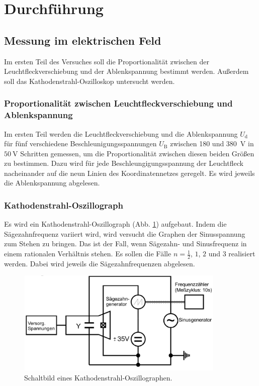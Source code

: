 \section{Durchführung}
\label{sec:Durchführung}

\subsection{Messung im elektrischen Feld}
Im ersten Teil des Versuches soll die Proportionalität zwischen
der Leuchtfleckverschiebung und der Ablenkspannung bestimmt werden.
Außerdem soll das Kathodenstrahl-Oszilloskop untersucht werden.

\subsubsection{Proportionalität zwischen Leuchtfleckverschiebung und Ablenkspannung}
Im ersten Teil werden die Leuchtfleckverschiebung und die 
Ablenkspannung $U_\text{d}$ für fünf verschiedene 
Beschleunigungsspannungen $U_\text{B}$ zwischen \num{180} und 
\SI{380}{\volt} in $\SI{50}{\volt}$ Schritten gemessen,
um die Proportionalität zwischen diesen beiden Größen zu
bestimmen. Dazu wird für jede Beschleungigungsspannung der
Leuchtfleck nacheinander auf die neun Linien des
Koordinatennetzes geregelt. Es wird jeweils die Ablenkspannung
abgelesen.

\subsubsection{Kathodenstrahl-Oszillograph}
Es wird ein Kathodenstrahl-Oszillograph (Abb. \ref{fig:oszillograph})
aufgebaut. Indem die Sägezahnfrequenz variiert wird,
wird versucht die Graphen der Sinusspannung zum Stehen zu bringen.
Das ist der Fall, wenn Sägezahn- und 
Sinusfrequenz in einem rationalen Verhältnis stehen. Es sollen 
die Fälle $n = \frac{1}{2}$, $\num{1}$, $\num{2}$ und $\num{3}$ realisiert 
werden. Dabei wird jeweils die Sägezahnfrequenzen abgelesen. 
\begin{figure}
    \centering
    \includegraphics[width=10cm, height=5cm]{build/V501_b.png}
    \caption{Schaltbild eines Kathodenstrahl-Oszillographen. \cite{V501}}
    \label{fig:oszillograph}
\end{figure}

